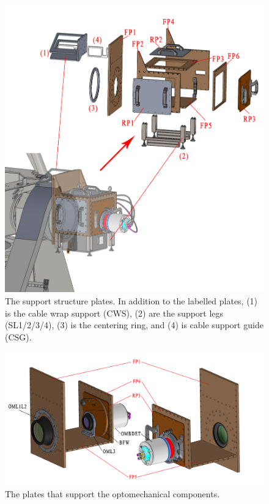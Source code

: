 \documentclass{article}
\begin{document}
\begin{figure}
\begin{center}
\includegraphics[width=\linewidth]{newfigures/Fig3_3.png}
\end{center}
\caption[The support structure plates.]{The support structure plates. In addition to the labelled plates, (1) is the cable wrap support (CWS), (2) are the support legs (SL1/2/3/4), (3) is the centering ring, and (4) is cable support guide (CSG).}
\label{figure:alex-ss-exploded}
\end{figure}

\begin{figure}
\begin{center}
\includegraphics[width=\linewidth]{newfigures/Fig3_4.png}
\end{center}
\caption{The plates that support the optomechanical components.}
\label{figure:alex-support-plates}
\end{figure}
\end{document}
